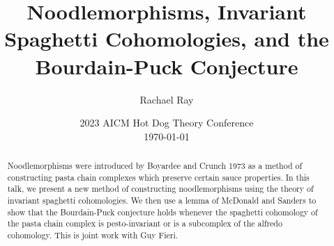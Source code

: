 \documentclass[12pt,notitlepage]{report}
\begin{document}
\title{
	Noodlemorphisms, Invariant Spaghetti Cohomologies,
	and the Bourdain-Puck Conjecture
}

\date{
	2023 AICM Hot Dog Theory Conference
	\\[12pt]
	\today
}

\author[1]{Rachael Ray}


\maketitle

\begin{abstract}
	Noodlemorphisms were introduced by Boyardee and Crunch 1973 as a method of constructing pasta chain complexes which preserve certain sauce properties. In this talk, we present a new method of constructing noodlemorphisms using the theory of invariant spaghetti cohomologies. We then use a lemma of McDonald and Sanders to show that the Bourdain-Puck conjecture holds whenever the spaghetti cohomology of the pasta chain complex is pesto-invariant or is a subcomplex of the alfredo cohomology. This is joint work with Guy Fieri.
\end{abstract}

\end{document}
